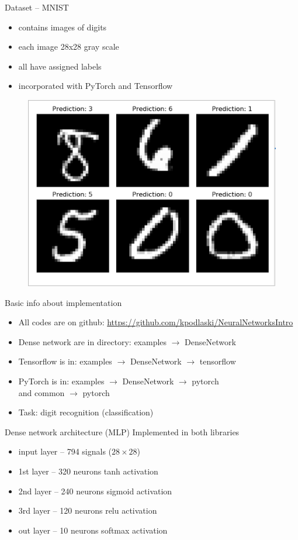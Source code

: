 \documentclass{beamer}%
\theoremstyle{definition}
\theoremstyle{definition}
\theoremstyle{example}
\theoremstyle{example}
\begin{document}
\begin{frame}{Dataset -- MNIST}
\begin{itemize}
\item contains images of digits
\item each image 28x28 gray scale
\item all have assigned labels
\item incorporated with PyTorch and Tensorflow
\end{itemize}
\begin{figure}
\centering
\includegraphics[width=.6\textwidth]{images/mnist.png}
\end{figure}
\end{frame}

\begin{frame}{Basic info about implementation}
\begin{itemize}
  \item All codes are on github: \url{https://github.com/kpodlaski/NeuralNetworksIntro}
  \item Dense network are in directory: examples $\rightarrow$ DenseNetwork
  \item Tensorflow is in: examples $\rightarrow$ DenseNetwork $\rightarrow$ tensorflow
  \item PyTorch is in: examples $\rightarrow$ DenseNetwork $\rightarrow$ pytorch \\and common $\rightarrow$ pytorch
  \item Task: digit recognition (classification)
\end{itemize}
\end{frame}


\begin{frame}{Dense network architecture (MLP)}
Implemented in both libraries
\begin{itemize}
  \item input layer -- 794 signals ($28\times28$)
  \item 1st layer -- 320 neurons tanh activation
  \item 2nd layer -- 240 neurons sigmoid activation
  \item 3rd layer -- 120 neurons relu activation
  \item out layer -- 10 neurons softmax activation
\end{itemize}
\end{frame}
\end{document}
